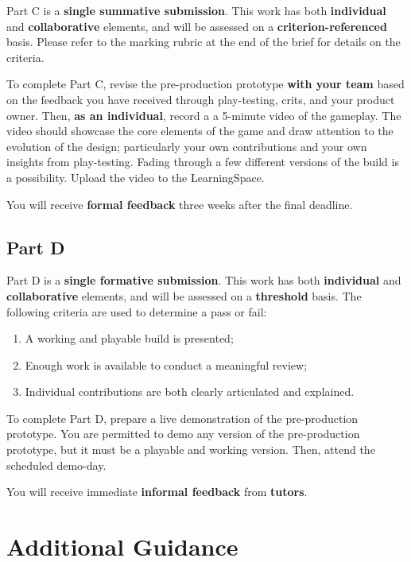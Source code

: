 \documentclass{../../fal_assignment}
\begin{document}
Part C is a \textbf{single summative submission}. This work has both \textbf{individual} and \textbf{collaborative} elements, and will be assessed on a \textbf{criterion-referenced} basis. Please refer to the marking rubric at the end of the brief for details on the criteria.

To complete Part C, revise the pre-production prototype \textbf{with your team} based on the feedback you have received through play-testing, crits, and your product owner. Then, \textbf{as an individual}, record a a 5-minute video of the gameplay. The video should showcase the core elements of the game and draw attention to the evolution of the design; particularly your own contributions and your own insights from play-testing. Fading through a few different versions of the build is a possibility. Upload the video to the LearningSpace.

You will receive \textbf{formal feedback} three weeks after the final deadline.

\subsection*{Part D}

Part D is a \textbf{single formative submission}. This work has both \textbf{individual} and \textbf{collaborative} elements, and will be assessed on a \textbf{threshold} basis. The following criteria are used to determine a pass or fail:

\begin{enumerate}[label=(\alph*)]
	\item A working and playable build is presented;
	\item Enough work is available to conduct a meaningful review;
	\item Individual contributions are both clearly articulated and explained.
\end{enumerate}

To complete Part D, prepare a live demonstration of the pre-production prototype. You are permitted to demo any version of the pre-production prototype, but it must be a playable and working version. Then, attend the scheduled demo-day.

You will receive immediate \textbf{informal feedback} from \textbf{tutors}.

\section*{Additional Guidance}
\end{document}
